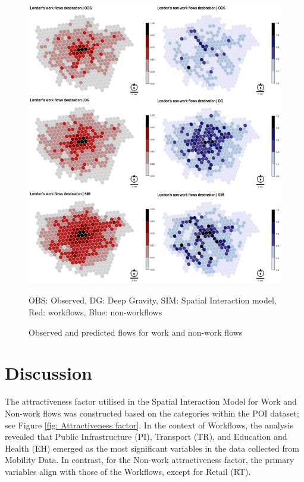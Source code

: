         \begin{figure}[H]
            \centering
            \includegraphics[width=15cm]{Images/Hex_comparativeanalysis.png}
            \caption{Observed and predicted flows for work and non-work flows}
            \footnotesize{OBS: Observed, DG: Deep Gravity, SIM: Spatial Interaction model, Red: workflows, Blue: non-workflows}
            \label{fig: nWF Model after calibration}
        \end{figure}

        
\section{Discussion}

       The attractiveness factor utilised in the Spatial Interaction Model for Work and Non-work flows was constructed based on the categories within the POI dataset; see Figure \ref{fig: Attractiveness factor}. In the context of Workflows, the analysis revealed that Public Infrastructure (PI), Transport (TR), and Education and Health (EH) emerged as the most significant variables in the data collected from Mobility Data. In contrast, for the Non-work attractiveness factor, the primary variables align with those of the Workflows, except for Retail (RT).

